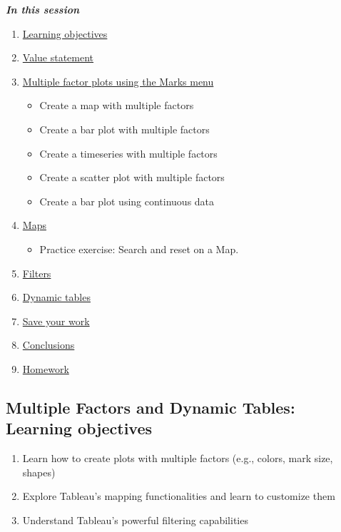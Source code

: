 \documentclass[
]{book}
\providecommand{\tightlist}{%
  \setlength{\itemsep}{0pt}\setlength{\parskip}{0pt}}
\begin{document}
\textbf{\emph{In this session }}

\begin{enumerate}
\def\labelenumi{\arabic{enumi}.}
\tightlist
\item
  \protect\hyperlink{multiple-factors-and-dynamic-tables-learning-objectives}{Learning objectives}
\item
  \protect\hyperlink{multiple-factors-and-dynamic-tables-value-statement}{Value statement}
\item
  \protect\hyperlink{Multiple-factor-plots-using-the-Marks-menu}{Multiple factor plots using the Marks menu}

  \begin{itemize}
  \tightlist
  \item
    Create a map with multiple factors
  \item
    Create a bar plot with multiple factors
  \item
    Create a timeseries with multiple factors
  \item
    Create a scatter plot with multiple factors
  \item
    Create a bar plot using continuous data
  \end{itemize}
\item
  \protect\hyperlink{maps}{Maps}

  \begin{itemize}
  \tightlist
  \item
    Practice exercise: Search and reset on a Map.
  \end{itemize}
\item
  \protect\hyperlink{filters}{Filters}
\item
  \protect\hyperlink{dynamic-tables}{Dynamic tables}
\item
  \protect\hyperlink{save-your-work}{Save your work}
\item
  \protect\hyperlink{conclusions}{Conclusions}
\item
  \protect\hyperlink{homework}{Homework}
\end{enumerate}

\hypertarget{multiple-factors-and-dynamic-tables-learning-objectives}{%
\subsection{Multiple Factors and Dynamic Tables: Learning objectives}\label{multiple-factors-and-dynamic-tables-learning-objectives}}

\begin{enumerate}
\def\labelenumi{\arabic{enumi}.}
\tightlist
\item
  Learn how to create plots with multiple factors (e.g., colors, mark size, shapes)
\item
  Explore Tableau's mapping functionalities and learn to customize them
\item
  Understand Tableau's powerful filtering capabilities
\end{enumerate}
\end{document}
